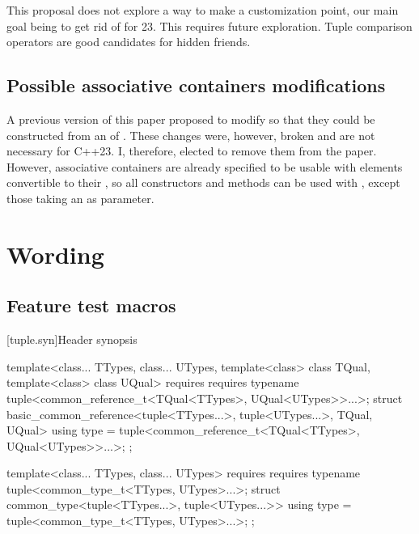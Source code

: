 \documentclass{wg21}
\begin{document}
This proposal does not explore a way to make  a customization point, our main goal being to get rid of  for 23.
This requires future exploration. Tuple comparison operators are good candidates for hidden friends.

\subsection{Possible associative containers modifications}

A previous version of this paper proposed to modify  so that
they could be constructed from an  of .
These changes were, however, broken and are not necessary for C++23. I, therefore, elected to remove them from the paper.
However, associative containers are already specified to be usable with elements convertible to their
, so all constructors and methods can be used with , except those taking an
 as parameter.

\section{Wording}


\subsection{Feature test macros}



[tuple.syn]{Header  synopsis}
\begin{codeblock}
#include <compare>              // see \ref{compare.syn}

namespace std {
// \ref{tuple.tuple}, class template 
template<class... Types>
class tuple;

\end{codeblock}
\begin{removedblock}
\begin{codeblock}
template<class... TTypes, class... UTypes, template<class> class TQual,
template<class> class UQual>
requires requires { typename tuple<common_reference_t<TQual<TTypes>, UQual<UTypes>>...>; }
struct basic_common_reference<tuple<TTypes...>, tuple<UTypes...>, TQual, UQual> {
    using type = tuple<common_reference_t<TQual<TTypes>, UQual<UTypes>>...>;
};

template<class... TTypes, class... UTypes>
requires requires { typename tuple<common_type_t<TTypes, UTypes>...>; }
struct common_type<tuple<TTypes...>, tuple<UTypes...>> {
    using type = tuple<common_type_t<TTypes, UTypes>...>;
};
\end{codeblock}
\end{removedblock}
\end{document}
